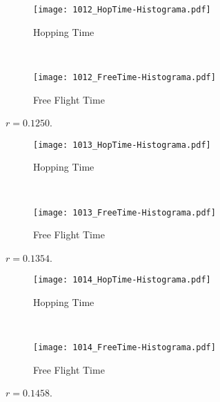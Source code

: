 \documentclass[a4paper,10pt]{article}
\begin{document}
\begin{figure}[h]
        \centering
        \begin{subfigure}[b]{0.45\textwidth}
                \centering
                \texttt{[image: 1012\_HopTime-Histograma.pdf]}
                \caption{Hopping Time}              
        \end{subfigure}%
        ~ %
        \begin{subfigure}[b]{0.45\textwidth}
                \centering
                \texttt{[image: 1012\_FreeTime-Histograma.pdf]}
                \caption{Free Flight Time}                
        \end{subfigure}       
        \caption{ $r=0.1250$. }
\end{figure}

\begin{figure}[h]
        \centering
        \begin{subfigure}[b]{0.45\textwidth}
                \centering
                \texttt{[image: 1013\_HopTime-Histograma.pdf]}
                \caption{Hopping Time}              
        \end{subfigure}%
        ~ %
        \begin{subfigure}[b]{0.45\textwidth}
                \centering
                \texttt{[image: 1013\_FreeTime-Histograma.pdf]}
                \caption{Free Flight Time}                
        \end{subfigure}       
        \caption{ $r=0.1354$. }
\end{figure}

\begin{figure}[h]
        \centering
        \begin{subfigure}[b]{0.45\textwidth}
                \centering
                \texttt{[image: 1014\_HopTime-Histograma.pdf]}
                \caption{Hopping Time}              
        \end{subfigure}%
        ~ %
        \begin{subfigure}[b]{0.45\textwidth}
                \centering
                \texttt{[image: 1014\_FreeTime-Histograma.pdf]}
                \caption{Free Flight Time}                
        \end{subfigure}       
        \caption{ $r=0.1458$. }
\end{figure}
\end{document}
